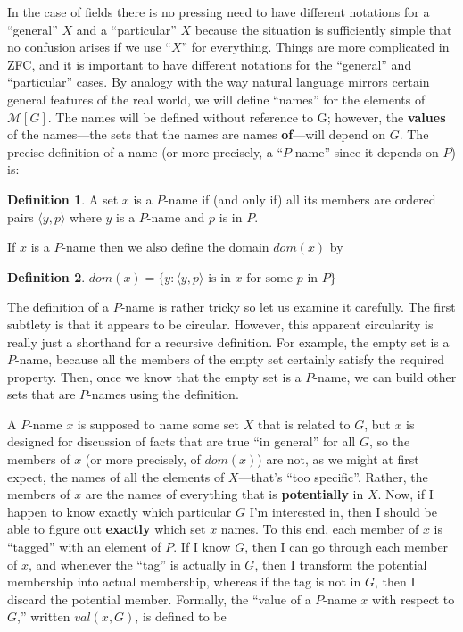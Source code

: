 \documentclass[10pt]{article}
\newcommand\axiom[1]{\textmd{#1}}
\theoremstyle{definition}
\newtheorem*{defn}{Definition}
\theoremstyle{remark}
\begin{document}
In the case of fields there is no pressing need to have different notations for a ``general'' $X$ and a ``particular'' $X$ because the situation is sufficiently simple that no confusion arises if we use ``$X$'' for everything. Things are more complicated in \axiom{ZFC}, and it is important to have different notations for the ``general'' and ``particular'' cases. By analogy with the way natural language mirrors certain general features of the real world, we will define ``names'' for the elements of $\mathcal M[G]$. The names will be defined without reference to G; however, the \textbf{values} of the names---the sets that the names are names \textbf{of}---will depend on $G$. The precise definition of a name (or more precisely, a ``$P$-name'' since it depends on $P$) is:

\begin{defn}
A set $x$ is a $P$-name if (and only if) all its members are ordered pairs $\langle y,p\rangle$ where $y$ is a $P$-name and $p$ is in $P$.
\end{defn}

If $x$ is a $P$-name then we also define the domain $dom(x)$ by

\begin{defn}
$dom(x) = \{y : \langle y,p\rangle\text{ is in }x\text{ for some }p\text{ in }P\}$
\end{defn}

The definition of a $P$-name is rather tricky so let us examine it carefully. The first subtlety is that it appears to be circular. However, this apparent circularity is really just a shorthand for a recursive definition. For example, the empty set is a $P$-name, because all the members of the empty set certainly satisfy the required property. Then, once we know that the empty set is a $P$-name, we can build other sets that are $P$-names using the definition.

A $P$-name $x$ is supposed to name some set $X$ that is related to $G$, but $x$ is designed for discussion of facts that are true ``in general'' for all $G$, so the members of $x$ (or more precisely, of $dom(x)$) are not, as we might at first expect, the names of all the elements of $X$---that's ``too specific''. Rather, the members of $x$ are the names of everything that is \textbf{potentially} in $X$. Now, if I happen to know exactly which particular $G$ I'm interested in, then I should be able to figure out \textbf{exactly} which set $x$ names. To this end, each member of $x$ is ``tagged'' with an element of $P$. If I know $G$, then I can go through each member of $x$, and whenever the ``tag'' is actually in $G$, then I transform the potential membership into actual membership, whereas if the tag is not in $G$, then I discard the potential member. Formally, the ``value of a $P$-name $x$ with respect to $G$,'' written $val(x,G)$, is defined to be
\end{document}
